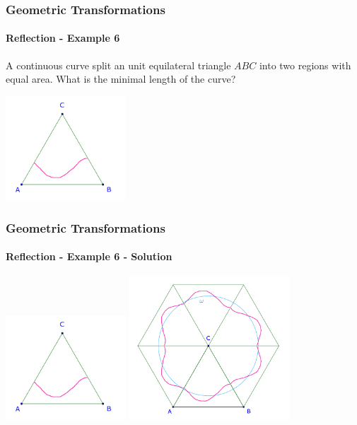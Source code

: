 \documentclass[8pt,xcolor=table,dvipsnames]{beamer}
\begin{document}
\begin{frame}[t]
    \frametitle{Geometric Transformations}
    \framesubtitle{Reflection - Example 6}
    \begin{example}
        A continuous curve split an unit equilateral triangle $ABC$ into two regions with equal area.
        What is the minimal length of the curve?    
    \end{example}

    \bigbreak
    \begin{center}
        \includegraphics[width=4.5cm]{./svg/pdf/24-25-t4-p20.pdf}
    \end{center}
\end{frame}

\begin{frame}[t]
    \frametitle{Geometric Transformations}
    \framesubtitle{Reflection - Example 6 - Solution}
    \begin{center}
        \begin{overprint}
            \centering\includegraphics[width=4.5cm]{./svg/pdf/24-25-t4-p20.pdf}
            \centering\includegraphics[width=6cm]{./svg/pdf/24-25-t4-p20-2.pdf}
        \end{overprint}        
    \end{center}

    
\end{frame}
\end{document}
